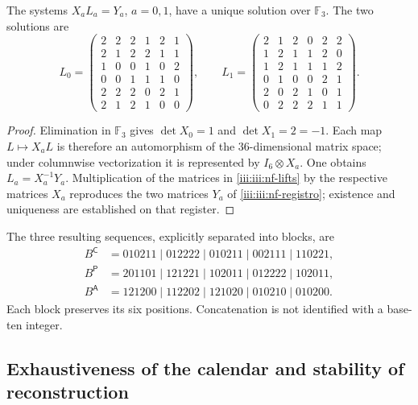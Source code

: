 \begin{proposition}
\label{iii:iii:nf-unicidad}
The systems $X_aL_a=Y_a$, $a=0,1$, have a unique solution over
$\mathbb F_3$. The two solutions are
\begingroup\small
\begin{equation}
L_0=\begin{pmatrix}
2&2&2&1&2&1\\2&1&2&2&1&1\\1&0&0&1&0&2\\
0&0&1&1&1&0\\2&2&2&0&2&1\\2&1&2&1&0&0
\end{pmatrix},\qquad
L_1=\begin{pmatrix}
2&1&2&0&2&2\\1&2&1&1&2&0\\1&2&1&1&1&2\\
0&1&0&0&2&1\\2&0&2&1&0&1\\0&2&2&2&1&1
\end{pmatrix}.
\label{iii:iii:nf-lifts}
\end{equation}
\endgroup
\end{proposition}

\begin{proof}
Elimination in $\mathbb F_3$ gives $\det X_0=1$ and
$\det X_1=2=-1$. Each map $L\mapsto X_aL$ is therefore
an automorphism of the $36$-dimensional matrix space; under columnwise
vectorization it is represented by $I_6\otimes X_a$.
One obtains $L_a=X_a^{-1}Y_a$. Multiplication of the matrices in
\eqref{iii:iii:nf-lifts} by the respective matrices $X_a$ reproduces the
two matrices $Y_a$ of \eqref{iii:iii:nf-registro}; existence and uniqueness
are established on that register.
\end{proof}

The three resulting sequences, explicitly separated into blocks,
are
\begin{align*}
 B^{\mathsf C}&=010211\mid012222\mid010211\mid002111\mid110221,\\
 B^{\mathsf P}&=201101\mid121221\mid102011\mid012222\mid102011,\\
 B^{\mathsf A}&=121200\mid112202\mid121020\mid010210\mid010200.
\end{align*}
Each block preserves its six positions. Concatenation is not
identified with a base-ten integer.

\subsection{Exhaustiveness of the calendar and stability of reconstruction}

